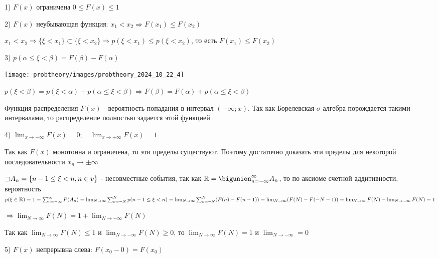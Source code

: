 \documentclass[12pt]{article}
\begin{document}
    1) $F(x)$ ограничена $0 \leq F(x) \leq 1$

    2) $F(x)$ неубывающая функция: $x_1 < x_2 \Longrightarrow F(x_1) \leq F(x_2)$ 

    \begin{MyProof}
        $x_1 < x_2 \Longrightarrow \{\xi < x_1\} \subset \{\xi < x_2\} \Longrightarrow p(\xi < x_1) \leq p(\xi < x_2)$, то есть $F(x_1) \leq F(x_2)$
    \end{MyProof}

    3) $p(\alpha \leq \xi < \beta) = F(\beta) - F(\alpha)$

    \texttt{[image: probtheory/images/probtheory\_2024\_10\_22\_4]}

    \begin{MyProof}
        $p(\xi < \beta) = p(\xi < \alpha) + p(\alpha \leq \xi < \beta) \Longrightarrow F(\beta) = F(\alpha) + p(\alpha \leq \xi < \beta)$
    \end{MyProof}
    
    \Notas Функция распределения $F(x)$ - вероятность попадания в интервал $(-\infty; x)$. Так как Борелевская $\sigma$-алгебра порождается такими интервалами,
    то распределение полностью задается этой функцией

    4) $\lim_{x \to -\infty} F(x) = 0; \quad \lim_{x \to +\infty} F(x) = 1$

    \begin{MyProof}
        Так как $F(x)$ монотонна и ограничена, то эти пределы существуют. Поэтому достаточно доказать эти пределы для некоторой последовательности $x_n \to \pm \infty$

        $\mathord{\sqsupset} A_n = \{n - 1 \leq \xi < n, n \in v\}$ - несовместные события, так как $\Real = \bigunion_{n = -\infty}^\infty A_n$, то
        по аксиоме счетной аддитивности, вероятность $p(\xi \in \mathbb{R}) = 1 = \sum_{n = -\infty}^\infty P(A_n) = \lim_{N \to \infty} \sum_{n = -N}^N p(n - 1 \leq \xi < n) = 
        \lim_{N \to \infty} \sum_{n = -N}^N (F(n) - F(n - 1)) = \lim_{N \to \infty} (F(N) - F(-N - 1)) = \lim_{N \to \infty} F(N) - \lim_{N \to -\infty} F(N) = 1$

        $\Longrightarrow \lim_{N \to \infty} F(N) = 1 + \lim_{N \to -\infty} F(N) $

        Так как $\lim_{N \to \infty} F(N) \leq 1$ и $\lim_{N \to -\infty} F(N) \geq 0$, то $\lim_{N \to \infty} F(N) = 1$ и $\lim_{N \to -\infty} = 0$
    \end{MyProof}
    
    5) $F(x)$ непрерывна слева: $F(x_0 - 0) = F(x_0)$
\end{document}
